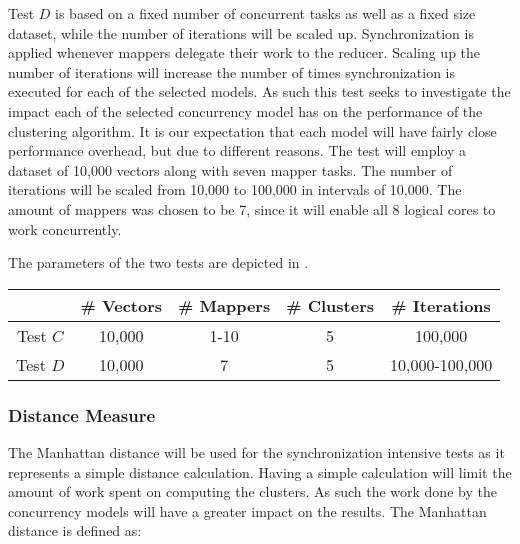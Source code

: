 Test $D$ is based on a fixed number of concurrent tasks as well as a fixed size dataset, while the number of iterations will be scaled up. Synchronization is applied whenever mappers delegate their work to the reducer. Scaling up the number of iterations will increase the number of times synchronization is executed for each of the selected models. As such this test seeks to investigate the impact each of the selected concurrency model has on the performance of the clustering algorithm. It is our expectation that each model will have fairly close performance overhead, but due to different reasons. 
The test will employ a dataset of 10,000 vectors along with seven mapper tasks. The number of iterations will be scaled from 10,000 to 100,000 in intervals of 10,000. The amount of mappers was chosen to be 7, since it will enable all 8 logical cores to work concurrently.

The parameters of the two tests are depicted in .

\begin{center}
\begin{table}[h]
\centering
\begin{tabular}{c|cccc}
       & \# Vectors        & \# Mappers			 	& \# Clusters & \# Iterations \\ \hline
Test $C$ & 10,000            & 1-10        			& 5           & 100,000      \\
Test $D$ & 10,000			 & 7          			& 5           & 10,000-100,000
\end{tabular}
\end{table}
 \label{tab:test_description} 
\end{center}

\subsubsection{Distance Measure}
The Manhattan distance will be used for the synchronization intensive tests as it represents a simple distance calculation. Having a simple calculation will limit the amount of work spent on computing the clusters. As such the work done by the concurrency models will have a greater impact on the results. The Manhattan distance is defined as\cite[p. 41]{amatriain2011data}:
 
